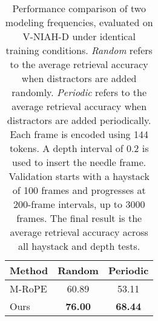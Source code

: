 \renewcommand{\arraystretch}{1.2}  %
\setlength{\tabcolsep}{10pt}
\begin{table}[!h]
\centering
\footnotesize
\caption{
Performance comparison of two modeling frequencies, evaluated on V-NIAH-D under identical training conditions. \textit{Random} refers to the average retrieval accuracy when distractors are added randomly. \textit{Periodic} refers to the average retrieval accuracy when distractors are added periodically. 
Each frame is encoded using 144 tokens. A depth interval of 0.2 is used to insert the needle frame. Validation starts with a haystack of 100 frames and progresses at 200-frame intervals, up to 3000 frames. The final result is the average retrieval accuracy across all haystack and depth tests.
}

\label{tab:v-niah-d-periodic-appendix}
\vspace{2mm}
\begin{tabular}{lcc}
\toprule
\textbf{Method} & \textbf{Random} & \textbf{Periodic}  \\ \hline
M-RoPE & 60.89 & 53.11 \\
Ours & \textbf{76.00} & \textbf{68.44} \\
\bottomrule
\end{tabular}
\end{table}